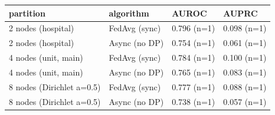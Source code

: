 \begin{tabular}{llll}
\toprule
partition & algorithm & AUROC & AUPRC \\
\midrule
2 nodes (hospital) & FedAvg (sync) & 0.796 (n=1) & 0.098 (n=1) \\
2 nodes (hospital) & Async (no DP) & 0.754 (n=1) & 0.061 (n=1) \\
4 nodes (unit, main) & FedAvg (sync) & 0.784 (n=1) & 0.100 (n=1) \\
4 nodes (unit, main) & Async (no DP) & 0.765 (n=1) & 0.083 (n=1) \\
8 nodes (Dirichlet a=0.5) & FedAvg (sync) & 0.777 (n=1) & 0.088 (n=1) \\
8 nodes (Dirichlet a=0.5) & Async (no DP) & 0.738 (n=1) & 0.057 (n=1) \\
\bottomrule
\end{tabular}

